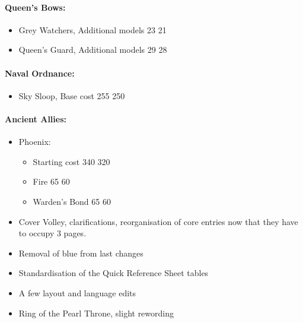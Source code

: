 \begin{multicols}{2}
\paragraph{Queen's Bows:}
\begin{itemize}
	\item Grey Watchers, Additional models 23 \costdown{} 21
	\item Queen's Guard, Additional models 29 \costdown{} 28
\end{itemize}
\paragraph{Naval Ordnance:}
\begin{itemize}
	\item Sky Sloop, Base cost 255 \costdown{} 250
\end{itemize}
\paragraph{Ancient Allies:}
\begin{itemize}
	\item Phoenix:
	\begin{itemize}
		\item Starting cost 340 \costdown{} 320
		\item Fire 65 \costdown{} 60
		\item Warden's Bond 65 \costdown{} 60
	\end{itemize}
\end{itemize}
\end{multicols}

\subtitle{beta 2.1.6}

\begin{itemize}
\item Cover Volley, clarifications, reorganisation of core entries now that they have to occupy 3 pages.
\end{itemize}

\subtitle{beta 2.1.5}

\begin{itemize}
\item Removal of blue from last changes
\item Standardisation of the Quick Reference Sheet tables
\item A few layout and language edits
\item Ring of the Pearl Throne, slight rewording
\end{itemize}
